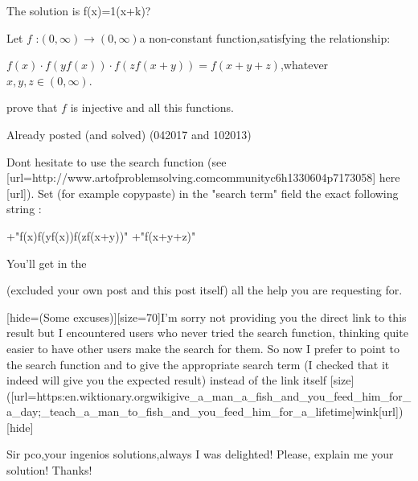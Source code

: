 \begin{solution}
	The solution is f(x)=1\/(x+k)?
\end{solution}



\begin{solution}
	\begin{tcolorbox}Let $f$ :$\left(0,\infty\right)\rightarrow\left(0,\infty\right)$a
non-constant function,satisfying the relationship:

$f\left(x\right)\cdotp f\left(yf\left(x\right)\right)\cdotp f\left(zf\left(x+y\right)\right)=f\left(x+y+z\right)$,whatever
$x,y,z\in\left(0,\infty\right)$.

prove that $f$ is injective and all this functions.\end{tcolorbox}
Already posted (and solved) (04\/2017 and 10\/2013)

Dont hesitate to use the search function (see [url=http://www.artofproblemsolving.com\/community\/c6h1330604p7173058] here [\/url]).
Set (for example copy\/paste) in the "search term" field the exact following string : 

+"f(x)f(yf(x))f(zf(x+y))" +"f(x+y+z)"

You'll get in the  (excluded your own post and this post itself) all the help you are requesting for.

[hide=(Some excuses)][size=70]I'm sorry not providing you the direct link to this result but I encountered users who never tried the search function, thinking quite easier to have other users make the search for them. So now I prefer to point to the search function and to give the appropriate search term (I checked that it indeed will give you the expected result) instead of the link itself [\/size]([url=https:\/\/en.wiktionary.org\/wiki\/give_a_man_a_fish_and_you_feed_him_for_a_day;_teach_a_man_to_fish_and_you_feed_him_for_a_lifetime]wink[\/url])[\/hide]




\end{solution}



\begin{solution}
	Sir pco,your ingenios solutions,always I was delighted! Please, explain me your solution! Thanks!
\end{solution}



